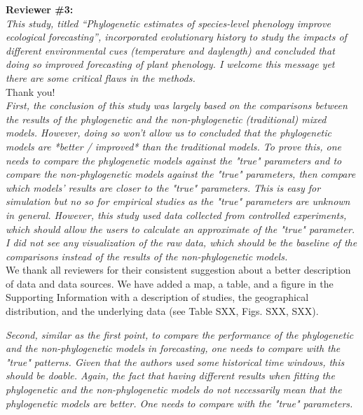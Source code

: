 \documentclass[11pt]{article}
\begin{document}
{\bf Reviewer \#3:}\\

\emph{This study, titled “Phylogenetic estimates of species-level phenology improve ecological forecasting”, incorporated evolutionary history to study the impacts of different environmental cues (temperature and daylength) and concluded that doing so improved forecasting of plant phenology. I welcome this message yet there are some critical flaws in the methods.}\\

Thank you!\\

\emph{First, the conclusion of this study was largely based on the comparisons between the results of the phylogenetic and the non-phylogenetic (traditional) mixed models. However, doing so won't allow us to concluded that the phylogenetic models are *better / improved* than the traditional models. To prove this, one needs to compare the phylogenetic models against the "true" parameters and to compare the non-phylogenetic models against the "true" parameters, then compare which models' results are closer to the "true" parameters. This is easy for simulation but no so for empirical studies as the "true" parameters are unknown in general. However, this study used data collected from controlled experiments, which should allow the users to calculate an approximate of the "true" parameter. I did not see any visualization of the raw data, which should be the baseline of the comparisons instead of the results of the non-phylogenetic models.}\\

We thank all reviewers for their consistent suggestion about a better description of data and data sources. We have added a map, a table, and a figure in the Supporting Information with a description of studies, the geographical distribution, and the underlying data (see Table SXX, Figs. SXX, SXX).

\emph{Second, similar as the first point, to compare the performance of the phylogenetic and the non-phylogenetic models in forecasting, one needs to compare with the "true" patterns. Given that the authors used some historical time windows, this should be doable. Again, the fact that having different results when fitting the phylogenetic and the non-phylogenetic models do not necessarily mean that the phylogenetic models are better. One needs to compare with the "true" parameters.}\\
\end{document}
